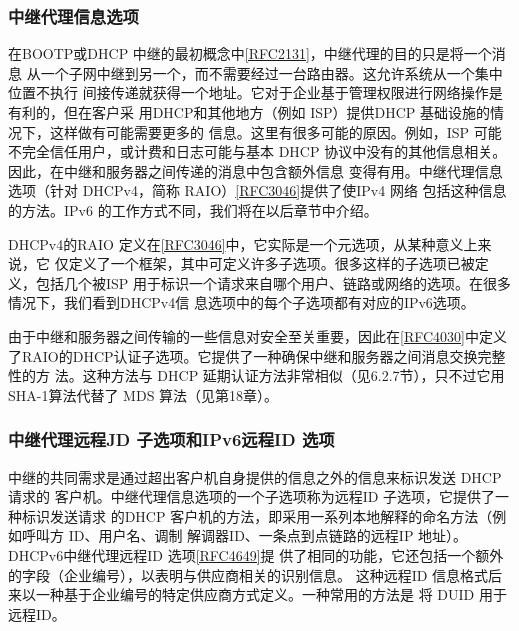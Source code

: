 \subsubsection{中继代理信息选项}
在BOOTP或DHCP
中继的最初概念中\href{https://www.rfc-editor.org/rfc/rfc2131}{\href{https://www.rfc-editor.org/rfc/rfc2131}{[RFC2131]}}，中继代理的目的只是将一个消息
从一个子网中继到另一个，而不需要经过一台路由器。这允许系统从一个集中位置不执行
间接传递就获得一个地址。它对于企业基于管理权限进行网络操作是有利的，但在客户采
用DHCP和其他地方（例如 ISP）提供DHCP 基础设施的情况下，这样做有可能需要更多的
信息。这里有很多可能的原因。例如，ISP 可能不完全信任用户，或计费和日志可能与基本
DHCP 协议中没有的其他信息相关。因此，在中继和服务器之间传递的消息中包含额外信息
变得有用。中继代理信息选项（针对 DHCPv4，简称
RAIO）\href{https://www.rfc-editor.org/rfc/rfc3046}{\href{https://www.rfc-editor.org/rfc/rfc3046}{[RFC3046]}}提供了使IPv4
网络
包括这种信息的方法。IPv6 的工作方式不同，我们将在以后章节中介绍。

DHCPv4的RAIO
定义在\href{https://www.rfc-editor.org/rfc/rfc3046}{\href{https://www.rfc-editor.org/rfc/rfc3046}{[RFC3046]}}中，它实际是一个元选项，从某种意义上来说，它
仅定义了一个框架，其中可定义许多子选项。很多这样的子选项已被定义，包括几个被ISP
用于标识一个请求来自哪个用户、链路或网络的选项。在很多情况下，我们看到DHCPv4信
息选项中的每个子选项都有对应的IPv6选项。

由于中继和服务器之间传输的一些信息对安全至关重要，因此在\href{https://www.rfc-editor.org/rfc/rfc4030}{\href{https://www.rfc-editor.org/rfc/rfc4030}{[RFC4030]}}中定义
了RAIO的DHCP认证子选项。它提供了一种确保中继和服务器之间消息交换完整性的方
法。这种方法与 DHCP 延期认证方法非常相似（见6.2.7节），只不过它用SHA-1算法代替了
MDS 算法（见第18章）。

\subsubsection{中继代理远程JD 子选项和IPv6远程ID 选项}
中继的共同需求是通过超出客户机自身提供的信息之外的信息来标识发送 DHCP 请求的
客户机。中继代理信息选项的一个子选项称为远程ID 子选项，它提供了一种标识发送请求
的DHCP 客户机的方法，即采用一系列本地解释的命名方法（例如呼叫方 ID、用户名、调制
解调器ID、一条点到点链路的远程IP 地址）。DHCPv6中继代理远程ID
选项\href{https://www.rfc-editor.org/rfc/rfc4649}{\href{https://www.rfc-editor.org/rfc/rfc4649}{[RFC4649]}}提
供了相同的功能，它还包括一个额外的字段（企业编号），以表明与供应商相关的识别信息。
这种远程ID 信息格式后来以一种基于企业编号的特定供应商方式定义。一种常用的方法是
将 DUID 用于远程ID。

